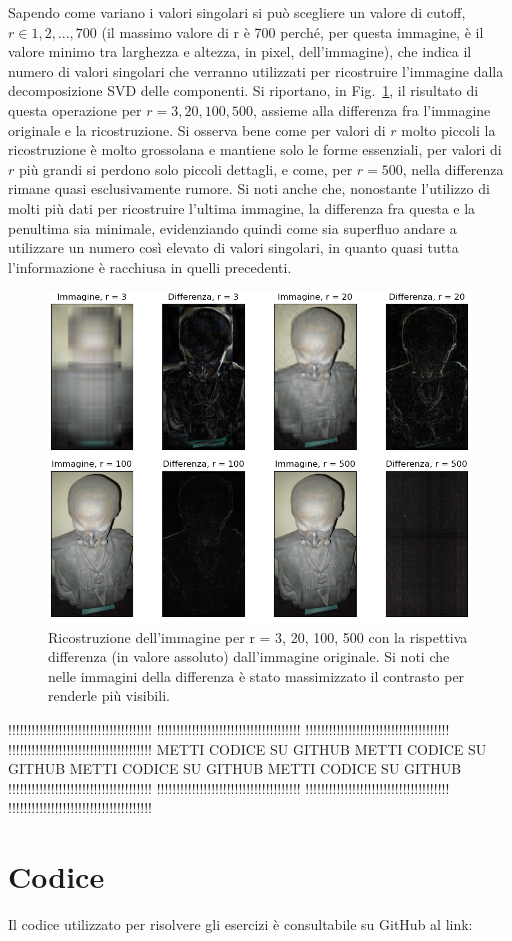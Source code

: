 \documentclass[a4paper]{article}
\renewcommand{\figurename}{Fig.}
\begin{document}
Sapendo come variano i valori singolari si può scegliere un valore di cutoff, \(r \in {1, 2, ..., 700}\) 
(il massimo valore di r è 700 perché, per questa immagine, è il valore minimo tra larghezza e altezza, in pixel, dell'immagine), che indica il numero di 
valori singolari che verranno utilizzati per ricostruire l'immagine dalla decomposizione SVD delle componenti. 
Si riportano, in \figurename~\ref{fig:es_2b_2}, il risultato di questa operazione per \(r=3,20,100,500\), 
assieme alla differenza fra l'immagine originale e la ricostruzione. Si osserva bene come per valori di \(r\) molto piccoli la ricostruzione
è molto grossolana e mantiene solo le forme essenziali, per valori di \(r\) più grandi si perdono solo piccoli dettagli, e come, per \(r=500\),
nella differenza rimane quasi esclusivamente rumore. Si noti anche che, nonostante l'utilizzo di molti più dati per ricostruire l'ultima immagine, la 
differenza fra questa e la penultima sia minimale, evidenziando quindi come sia superfluo andare a utilizzare un numero così elevato di valori 
singolari, in quanto quasi tutta l'informazione è racchiusa in quelli precedenti.
\begin{figure}[H]
    \centering
    \includegraphics[width=.95\linewidth]{Es_2b_2.png}
    \caption{Ricostruzione dell'immagine per r = 3, 20, 100, 500 con la rispettiva differenza (in valore assoluto) dall'immagine originale. Si noti che
    nelle immagini della differenza è stato massimizzato il contrasto per renderle più visibili. \label{fig:es_2b_2}}
\end{figure}

!!!!!!!!!!!!!!!!!!!!!!!!!!!!!!!!!!!!!
!!!!!!!!!!!!!!!!!!!!!!!!!!!!!!!!!!!!!
!!!!!!!!!!!!!!!!!!!!!!!!!!!!!!!!!!!!!
!!!!!!!!!!!!!!!!!!!!!!!!!!!!!!!!!!!!!
METTI CODICE SU GITHUB
METTI CODICE SU GITHUB
METTI CODICE SU GITHUB
METTI CODICE SU GITHUB
!!!!!!!!!!!!!!!!!!!!!!!!!!!!!!!!!!!!!
!!!!!!!!!!!!!!!!!!!!!!!!!!!!!!!!!!!!!
!!!!!!!!!!!!!!!!!!!!!!!!!!!!!!!!!!!!!
!!!!!!!!!!!!!!!!!!!!!!!!!!!!!!!!!!!!!


\section*{Codice}
Il codice utilizzato per risolvere gli esercizi è consultabile su GitHub al link: 
\end{document}
